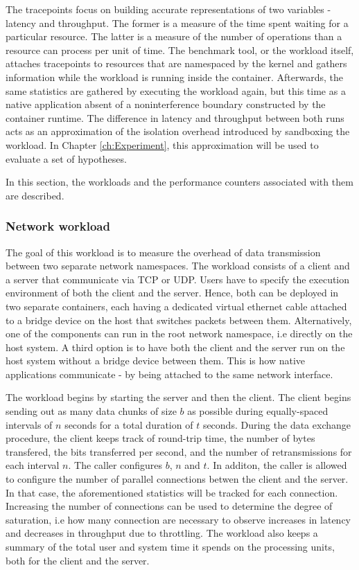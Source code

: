 The tracepoints focus on building accurate representations of two variables - latency and throughput. 
The former is a measure of the time spent waiting for a particular resource. The latter 
is a measure of the number of operations than a resource can process per unit of time.
The benchmark tool, or the workload itself, attaches tracepoints to resources 
that are namespaced by the kernel and gathers information while the workload is running inside 
the container. Afterwards, the same statistics are gathered by executing the workload again, but this time 
as a native application absent of a noninterference boundary constructed by the container runtime. 
The difference in latency and throughput between both runs acts as an approximation of the isolation 
overhead introduced by sandboxing the workload. In Chapter \ref{ch:Experiment}, this approximation will be used 
to evaluate a set of hypotheses. 

In this section, the workloads and the performance counters associated with them are described. 

\subsubsection{Network workload}
\label{ch:concept/benchmark/net-workload}
The goal of this workload is to measure the overhead of data transmission between 
two separate network namespaces. The workload consists of a client and a server that communicate 
via TCP or UDP. Users have to specify the execution environment of both the client 
and the server. Hence, both can be deployed in two separate containers, each having a dedicated
virtual ethernet cable attached to a bridge device on the host that switches packets between them.
Alternatively, one of the components can run 
in the root network namespace, i.e directly on the host system. A third option is to have both 
the client and the server run on the host system without a bridge device between them. This is how 
native applications communicate - by being attached to the same network interface. 

The workload begins by starting the server and then the client. The client begins sending out as many 
data chunks of size $b$ as possible during equally-spaced intervals of $n$ seconds for a total 
duration of $t$ seconds.
During the data exchange procedure, the client keeps track of round-trip time, the number 
of bytes transfered, the bits transferred per second, and the number of retransmissions for each interval $n$. 
The caller configures $b$, $n$ and $t$. In additon, the caller is allowed to configure the number 
of parallel connections betwen the client and the server. In that case, the aforementioned 
statistics will be tracked for each connection. Increasing the number of connections can be used to
determine the degree of saturation, i.e how many connection are necessary to 
observe increases in latency and decreases in throughput due to throttling.
The workload also keeps a summary of the total user and system time it spends on the processing units,
both for the client and the server.

